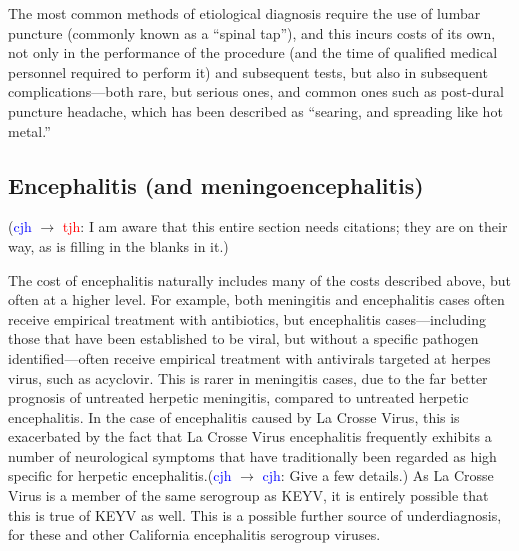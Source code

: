 \documentclass[12pt]{article}
\newcommand{\cjh}{\textcolor{blue}{cjh}}
\newcommand{\tjh}{\textcolor{red}{tjh}}
\newcommand{\msg}[3]{(#1 $\rightarrow$ #2: #3)}
\newcommand{\mcc}[1]{\msg\cjh\cjh{#1}}
\newcommand{\mct}[1]{\msg\cjh\tjh{#1}}
\begin{document}
            The most common methods of etiological diagnosis require the use of lumbar puncture (commonly known as a ``spinal tap''), and this incurs costs of its own, not only in the performance of the procedure (and the time of qualified medical personnel required to perform it) and subsequent tests, but also in subsequent complications---both rare, but serious ones, and common ones such as post-dural puncture headache, which has been described as ``searing, and spreading like hot metal.''\cite{weir2000sharp}

        \subsection{Encephalitis (and meningoencephalitis)}
            \label{cost-encephalitis}
            \mct{I am aware that this entire section needs citations; they are on their way, as is filling in the blanks in it.}

            The cost of encephalitis naturally includes many of the costs described above, but often at a higher level. For example, both meningitis and encephalitis cases often receive empirical treatment with antibiotics, but encephalitis cases---including those that have been established to be viral, but without a specific pathogen identified---often receive empirical treatment with antivirals targeted at herpes virus, such as acyclovir. This is rarer in meningitis cases, due to the far better prognosis of untreated herpetic meningitis, compared to untreated herpetic encephalitis. In the case of encephalitis caused by La Crosse Virus, this is exacerbated by the fact that La Crosse Virus encephalitis frequently exhibits a number of neurological symptoms that have traditionally been regarded as high specific for herpetic encephalitis.\mcc{Give a few details.} As La Crosse Virus is a member of the same serogroup as KEYV, it is entirely possible that this is true of KEYV as well. This is a possible further source of underdiagnosis, for these and other California encephalitis serogroup viruses.

\end{document}
